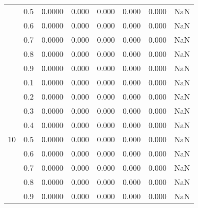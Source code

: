 \documentclass[11pt,a4paper]{report}
\begin{document}
\begin{longtable}{ | c | c || c | c | c | c | c | c | }
 & 0.5 & 0.0000 & 0.000 & 0.000 & 0.000 & 0.000 & NaN \\
 & 0.6 & 0.0000 & 0.000 & 0.000 & 0.000 & 0.000 & NaN \\
 & 0.7 & 0.0000 & 0.000 & 0.000 & 0.000 & 0.000 & NaN \\
 & 0.8 & 0.0000 & 0.000 & 0.000 & 0.000 & 0.000 & NaN \\
 & 0.9 & 0.0000 & 0.000 & 0.000 & 0.000 & 0.000 & NaN \\
 \hline
\multirow{9}{*}{10} & 0.1 & 0.0000 & 0.000 & 0.000 & 0.000 & 0.000 & NaN \\
 & 0.2 & 0.0000 & 0.000 & 0.000 & 0.000 & 0.000 & NaN \\
 & 0.3 & 0.0000 & 0.000 & 0.000 & 0.000 & 0.000 & NaN \\
 & 0.4 & 0.0000 & 0.000 & 0.000 & 0.000 & 0.000 & NaN \\
 & 0.5 & 0.0000 & 0.000 & 0.000 & 0.000 & 0.000 & NaN \\
 & 0.6 & 0.0000 & 0.000 & 0.000 & 0.000 & 0.000 & NaN \\
 & 0.7 & 0.0000 & 0.000 & 0.000 & 0.000 & 0.000 & NaN \\
 & 0.8 & 0.0000 & 0.000 & 0.000 & 0.000 & 0.000 & NaN \\
 & 0.9 & 0.0000 & 0.000 & 0.000 & 0.000 & 0.000 & NaN \\
 \hline
\hline
\end{longtable}
\end{document}
